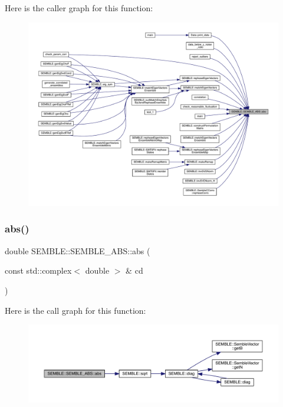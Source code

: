 Here is the caller graph for this function\+:
\nopagebreak
\begin{figure}[H]
\begin{center}
\leavevmode
\includegraphics[width=350pt]{d5/d47/namespaceSEMBLE_1_1SEMBLE__ABS_a908857ad13808705fb1109441c56233c_icgraph}
\end{center}
\end{figure}
\mbox{\label{namespaceSEMBLE_1_1SEMBLE__ABS_a32a1647f54f2fcc6d9aca7dff1e0bea8}} 
\subsubsection{\texorpdfstring{abs()}{abs()}\hspace{0.1cm}{\footnotesize\ttfamily [2/2]}}
{\footnotesize\ttfamily double S\+E\+M\+B\+L\+E\+::\+S\+E\+M\+B\+L\+E\+\_\+\+A\+B\+S\+::abs (\begin{DoxyParamCaption}\item[{const std\+::complex$<$ double $>$ \&}]{cd }\end{DoxyParamCaption})}

Here is the call graph for this function\+:
\nopagebreak
\begin{figure}[H]
\begin{center}
\leavevmode
\includegraphics[width=350pt]{d5/d47/namespaceSEMBLE_1_1SEMBLE__ABS_a32a1647f54f2fcc6d9aca7dff1e0bea8_cgraph}
\end{center}
\end{figure}
